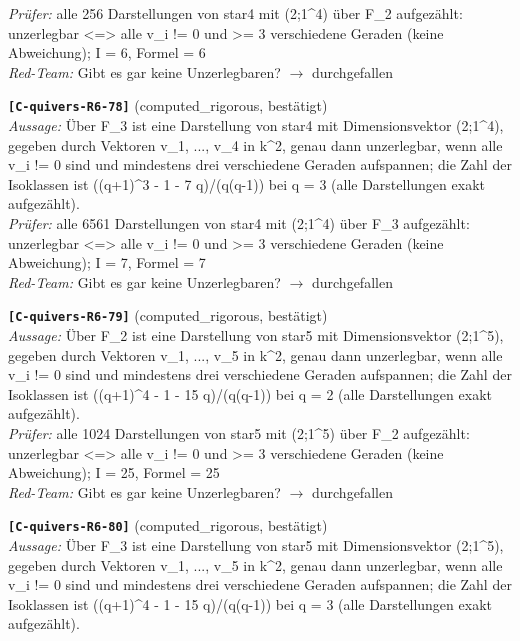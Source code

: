 \documentclass[11pt]{article}
\theoremstyle{definition}\newtheorem{definition}[theorem]{Definition}\newtheorem{remark}[theorem]{Remark}\newtheorem{observation}[theorem]{Numerical observation}
\begin{document}
\textit{Prüfer:} alle 256 Darstellungen von star4 mit (2;1\textasciicircum{}4) über F\_2 aufgezählt: unzerlegbar <=> alle v\_i != 0 und >= 3 verschiedene Geraden (keine Abweichung); I = 6, Formel = 6\\
\textit{Red-Team:} Gibt es gar keine Unzerlegbaren? $\to$ durchgefallen\par\medskip
\noindent\textbf{\texttt{[C-quivers-R6-78]}} (computed\_rigorous, bestätigt)\\
\textit{Aussage:} Über F\_3 ist eine Darstellung von star4 mit Dimensionsvektor (2;1\textasciicircum{}4), gegeben durch Vektoren v\_1, ..., v\_4 in k\textasciicircum{}2, genau dann unzerlegbar, wenn alle v\_i != 0 sind und mindestens drei verschiedene Geraden aufspannen; die Zahl der Isoklassen ist ((q+1)\textasciicircum{}3 - 1 - 7 q)/(q(q-1)) bei q = 3 (alle Darstellungen exakt aufgezählt).\\
\textit{Prüfer:} alle 6561 Darstellungen von star4 mit (2;1\textasciicircum{}4) über F\_3 aufgezählt: unzerlegbar <=> alle v\_i != 0 und >= 3 verschiedene Geraden (keine Abweichung); I = 7, Formel = 7\\
\textit{Red-Team:} Gibt es gar keine Unzerlegbaren? $\to$ durchgefallen\par\medskip
\noindent\textbf{\texttt{[C-quivers-R6-79]}} (computed\_rigorous, bestätigt)\\
\textit{Aussage:} Über F\_2 ist eine Darstellung von star5 mit Dimensionsvektor (2;1\textasciicircum{}5), gegeben durch Vektoren v\_1, ..., v\_5 in k\textasciicircum{}2, genau dann unzerlegbar, wenn alle v\_i != 0 sind und mindestens drei verschiedene Geraden aufspannen; die Zahl der Isoklassen ist ((q+1)\textasciicircum{}4 - 1 - 15 q)/(q(q-1)) bei q = 2 (alle Darstellungen exakt aufgezählt).\\
\textit{Prüfer:} alle 1024 Darstellungen von star5 mit (2;1\textasciicircum{}5) über F\_2 aufgezählt: unzerlegbar <=> alle v\_i != 0 und >= 3 verschiedene Geraden (keine Abweichung); I = 25, Formel = 25\\
\textit{Red-Team:} Gibt es gar keine Unzerlegbaren? $\to$ durchgefallen\par\medskip
\noindent\textbf{\texttt{[C-quivers-R6-80]}} (computed\_rigorous, bestätigt)\\
\textit{Aussage:} Über F\_3 ist eine Darstellung von star5 mit Dimensionsvektor (2;1\textasciicircum{}5), gegeben durch Vektoren v\_1, ..., v\_5 in k\textasciicircum{}2, genau dann unzerlegbar, wenn alle v\_i != 0 sind und mindestens drei verschiedene Geraden aufspannen; die Zahl der Isoklassen ist ((q+1)\textasciicircum{}4 - 1 - 15 q)/(q(q-1)) bei q = 3 (alle Darstellungen exakt aufgezählt).\\
\end{document}

